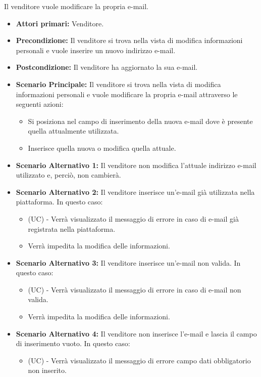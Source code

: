 Il venditore vuole modificare la propria e-mail.
\begin{itemize}
    \item \textbf{Attori primari:} Venditore.
    \item \textbf{Precondizione:} Il venditore si trova nella vista di modifica informazioni personali e vuole inserire un nuovo indirizzo e-mail.
    \item \textbf{Postcondizione:} Il venditore ha aggiornato la sua e-mail.
    \item \textbf{Scenario Principale:} Il venditore si trova nella vista di modifica informazioni personali e vuole modificare la propria e-mail attraverso le seguenti azioni:
    \begin{itemize}
        \item Si posiziona nel campo di inserimento della nuova e-mail dove è presente quella attualmente utilizzata.
        \item Inserisce quella nuova o modifica quella attuale.
    \end{itemize}
    \item \textbf{Scenario Alternativo 1:} Il venditore non modifica l'attuale indirizzo e-mail utilizzato e, perciò, non cambierà.
    \item \textbf{Scenario Alternativo 2:} Il venditore inserisce un'e-mail già utilizzata nella piattaforma. In questo caso:
    \begin{itemize}
        \item (UC) - Verrà visualizzato il messaggio di errore in caso di e-mail già registrata nella piattaforma.
        \item Verrà impedita la modifica delle informazioni.
    \end{itemize}
    \item \textbf{Scenario Alternativo 3:} Il venditore inserisce un'e-mail non valida. In questo caso:
    \begin{itemize}
        \item (UC) - Verrà visualizzato il messaggio di errore in caso di e-mail non valida.
        \item Verrà impedita la modifica delle informazioni.
    \end{itemize}
    \item \textbf{Scenario Alternativo 4:} Il venditore non inserisce l'e-mail e lascia il campo di inserimento vuoto. In questo caso:
    \begin{itemize}
        \item (UC) - Verrà visualizzato il messaggio di errore campo dati obbligatorio non inserito.

\end{itemize}
\end{itemize}
